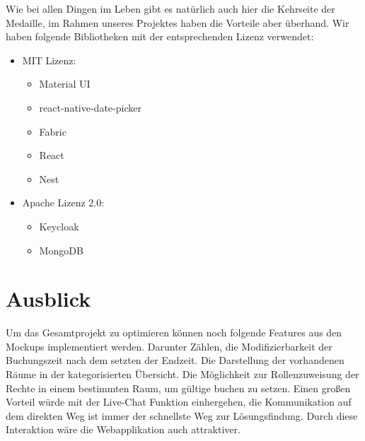 Wie bei allen Dingen im Leben gibt es natürlich auch hier die Kehrseite der Medaille, im Rahmen unseres Projektes haben die Vorteile aber überhand. 
Wir haben folgende Bibliotheken mit der entsprechenden Lizenz verwendet:

\begin{itemize}
\item	MIT Lizenz:
\begin{itemize}
    \item	Material UI
    \item	react-native-date-picker
    \item	Fabric
    \item	React
    \item	Nest
\end{itemize}
\end{itemize}
\begin{itemize}
    \item	Apache Lizenz 2.0:
    \begin{itemize}
\item	Keycloak
\item	MongoDB
\end{itemize}
\end{itemize}


\section{Ausblick}
Um das Gesamtprojekt zu optimieren können noch folgende Features aus den Mockups implementiert werden.
Darunter Zählen, die Modifizierbarkeit der Buchungszeit nach dem setzten der Endzeit. 
Die Darstellung der vorhandenen Räume in der kategorisierten Übersicht. 
Die Möglichkeit zur Rollenzuweisung der Rechte in einem bestimmten Raum, um gültige buchen zu setzen. 
Einen großen Vorteil würde mit der Live-Chat Funktion einhergehen, 
die Kommunikation auf dem direkten Weg ist immer der schnellste Weg zur Lösungsfindung. 
Durch diese Interaktion wäre die Webapplikation auch attraktiver.